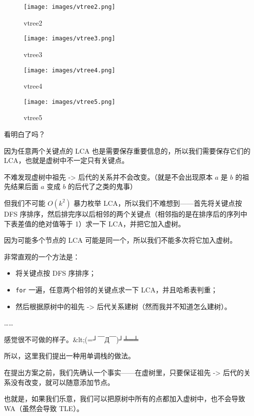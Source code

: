 {\begin{figure}[h]
\centering
\texttt{[image: images/vtree2.png]} 
\caption{vtree2}
\end{figure}

\begin{figure}[h]
\centering
\texttt{[image: images/vtree3.png]} 
\caption{vtree3}
\end{figure}

\begin{figure}[h]
\centering
\texttt{[image: images/vtree4.png]} 
\caption{vtree4}
\end{figure}

\begin{figure}[h]
\centering
\texttt{[image: images/vtree5.png]} 
\caption{vtree5}
\end{figure}

看明白了吗？

因为任意两个关键点的 LCA 也是需要保存重要信息的，所以我们需要保存它们的 LCA，也就是虚树中不一定只有关键点。

不难发现虚树中祖先 -> 后代的关系并不会改变。（就是不会出现原本 $a$ 是 $b$ 的祖先结果后面 $a$ 变成 $b$ 的后代了之类的鬼事）

但我们不可能 $O(k^2)$ 暴力枚举 LCA，所以我们不难想到——首先将关键点按 DFS 序排序，然后排完序以后相邻的两个关键点（相邻指的是在排序后的序列中下表差值的绝对值等于 1）求一下 LCA，并把它加入虚树。

因为可能多个节点的 LCA 可能是同一个，所以我们不能多次将它加入虚树。

非常直观的一个方法是：

\begin{itemize}
\item 将关键点按 DFS 序排序；
\item \texttt{for} 一遍，任意两个相邻的关键点求一下 LCA，并且哈希表判重；
\item 然后根据原树中的祖先 -> 后代关系建树（然而我并不知道怎么建树）。
\end{itemize}

……

感觉很不可做的样子。\&lt;(=┘￣Д￣)┘╧═╧

所以，这里我们提出一种用单调栈的做法。

在提出方案之前，我们先确认一个事实——在虚树里，只要保证祖先 -> 后代的关系没有改变，就可以随意添加节点。

也就是，如果我们乐意，我们可以把原树中所有的点都加入虚树中，也不会导致 WA（虽然会导致 TLE）。

}
